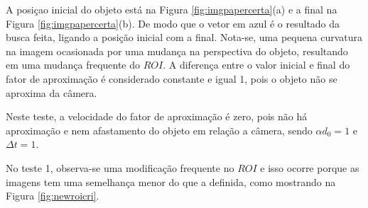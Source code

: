A posiçao inicial do objeto está na Figura \ref{fig:imgpapercerta}(a) 
e a final na Figura \ref{fig:imgpapercerta}(b). De modo que o
vetor em azul é o resultado da busca feita, ligando a posição inicial com a final.
Nota-se, uma pequena curvatura na imagem ocasionada por uma mudança
na perspectiva do objeto, resultando em uma mudança frequente do $ROI$.
A diferença entre o valor inicial e final do fator de aproximação é considerado constante
e igual 1, pois o objeto não se aproxima da câmera.

Neste teste, a velocidade do fator de aproximação é zero, pois não há aproximação e nem
afastamento do objeto em relação a câmera, sendo $\alpha d_0=1$ e $\Delta t=1$.

No teste 1, observa-se uma modificação frequente no $ROI$ e isso ocorre porque as imagens 
tem uma semelhança menor do que a definida, como mostrando na Figura \ref{fig:newroicri}.
